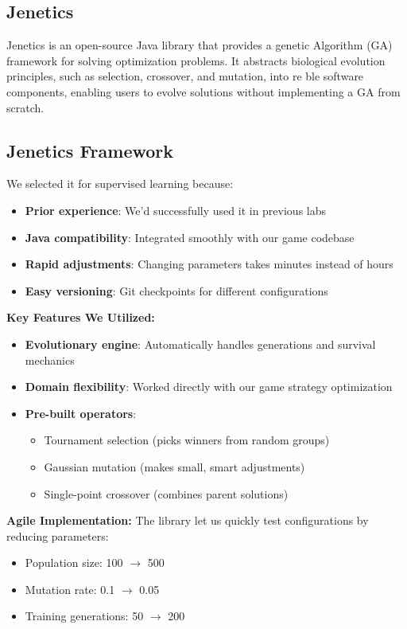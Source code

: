 \documentclass[sigconf]{acmart} %
\begin{document}
\subsection{Jenetics}
Jenetics is an open-source Java library that provides a genetic Algorithm (GA) framework for solving optimization problems. It abstracts biological evolution principles, such as selection, crossover, and mutation, into re ble software components, enabling users to evolve solutions without implementing a GA from scratch. 
\subsection{Jenetics Framework}
\label{subsec:jenetics}

We selected it for supervised learning because:
\begin{itemize}
    \item \textbf{Prior experience}: We'd successfully used it in previous labs
    \item \textbf{Java compatibility}: Integrated smoothly with our game codebase
    \item \textbf{Rapid adjustments}: Changing parameters takes minutes instead of hours
    \item \textbf{Easy versioning}: Git checkpoints for different \textsf{conf}igurations
\end{itemize}

\textbf{Key Features We Utilized:}
\begin{itemize}
    \item \textbf{Evolutionary engine}: Automatically handles generations and survival mechanics
    \item \textbf{Domain flexibility}: Worked directly with our game strategy optimization
    \item \textbf{Pre-built operators}: 
    \begin{itemize}
        \item Tournament selection (picks winners from random groups)
        \item Gaussian mutation (makes small, smart adjustments)
        \item Single-point crossover (combines parent solutions)
    \end{itemize}
\end{itemize}

\textbf{Agile Implementation:}
The library let us quickly test configurations by reducing parameters:
\begin{itemize}
    \item Population size: 100 $\rightarrow$ 500 
    \item Mutation rate: 0.1 $\rightarrow$ 0.05 
    \item Training generations: 50 $\rightarrow$ 200 
\end{itemize}
\end{document}
